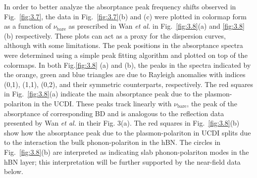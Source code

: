 \documentclass[preprint,
amsmath,amssymb,
aip,
jap,
floatfix,]{revtex4-2}
\begin{document}
			In order to better analyze the absorptance peak frequency shifts observed in Fig.~\ref{fig:3.7}, the data in Fig.~\ref{fig:3.7}(b) and (c) were plotted in colormap form as a function of $\nu_\mathrm{bare}$ as prescribed in Wan \textit{et al.} \cite{Wan:16} in Fig.~\ref{fig:3.8}(a) and \ref{fig:3.8} (b) respectively. These plots can act as a proxy for the dispersion curves, although with some limitations. The peak positions in the absorptance spectra were determined using a simple peak fitting algorithm \cite{peakfinding} and plotted on top of the colormaps. In both Fig.\ref{fig:3.8} (a) and (b), the peaks in the spectra indicated by the orange, green and blue triangles are due to Rayleigh anomalies \cite{Wood:1902,Rayleigh:1907,Gao:2009} with indices (0,1), (1,1), (0,2), and their symmetric counterparts, respectively. The red squares in Fig.~\ref{fig:3.8}(a) indicate the main absorptance peak due to the plasmon-polariton in the UCDI. These peaks track linearly with $\nu_\mathrm{bare}$, the peak of the absorptance of corresponding BD and is analogous to the reflection data presented by Wan \textit{et al.} \cite{Wan:16} in their Fig. 3(a). The red squares in Fig.~\ref{fig:3.8}(b) show how the absorptance peak due to the plasmon-polariton in UCDI splits due to the interaction the bulk phonon-polariton in the hBN. The circles in Fig.~\ref{fig:3.8}(b) are interpreted as indicating slab phonon-polariton modes in the hBN layer; this interpretation will be further supported by the near-field data below.
\end{document}
